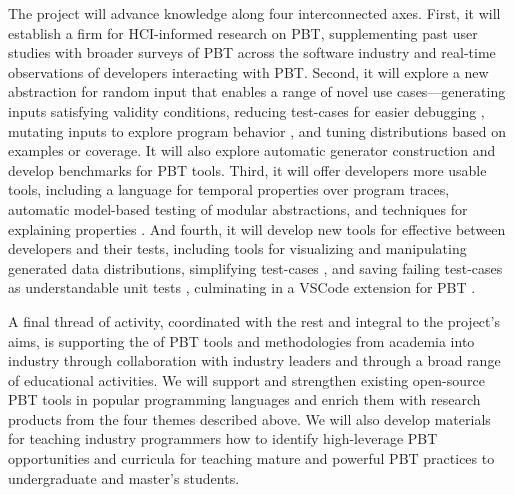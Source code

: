 The project will advance knowledge along four
interconnected axes.
%
First, it will establish a firm  for HCI-informed
research on PBT, supplementing past user studies with
broader surveys of PBT across the software industry and real-time
observations of developers interacting with PBT.
%
Second, it will explore a new abstraction for random input
 that enables a range of novel use
cases---generating inputs satisfying validity conditions, reducing
test-cases for easier debugging , mutating inputs to explore program
behavior , and tuning distributions based on examples or coverage. It
will also explore automatic generator construction and develop
benchmarks for PBT tools.
%
Third, it will offer developers more usable  tools,
including a language for temporal properties over program traces,
automatic model-based testing of
modular abstractions, and techniques for explaining properties 
.
%
And fourth, it will develop new tools for effective
 between developers and their tests, including
tools for visualizing and manipulating generated data
distributions, simplifying test-cases , and saving
  failing test-cases as understandable unit tests , culminating in a VSCode
  extension for PBT .  \iflater{}\fi

A final thread of activity, coordinated with the rest and integral to the
project's aims,
is supporting the  of PBT tools and
methodologies from academia into industry through collaboration with
industry leaders and through a broad  range of educational activities.
We will support and strengthen existing
open-source PBT tools in popular programming languages and enrich them
with research products from the four
themes described above.  
We will also
develop materials for teaching industry programmers how to identify
high-leverage PBT opportunities and curricula for teaching mature
and powerful PBT practices to undergraduate and master's students.


